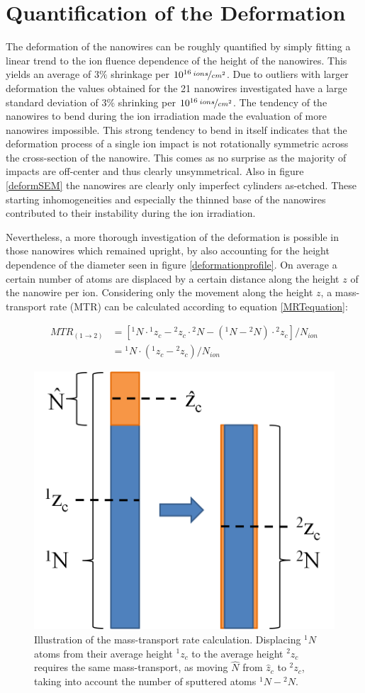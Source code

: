 \section{Quantification of the Deformation}
\label{sec:quantifydeformation}

The deformation of the nanowires can be roughly quantified by simply fitting a linear trend to the ion fluence dependence of the height of the nanowires. This yields an average of $3\%$ shrinkage per $10^{16}\,\nicefrac{ions}{cm^2}$. Due to outliers with larger deformation the values obtained for the 21 nanowires investigated have a large standard deviation of $3\%$ shrinking per $10^{16}\,\nicefrac{ions}{cm^2}$. The tendency of the nanowires to bend during the ion irradiation made the evaluation of more nanowires impossible. This strong tendency to bend in itself indicates that the deformation process of a single ion impact is not rotationally symmetric across the cross-section of the nanowire. This comes as no surprise as the majority of impacts are off-center and thus clearly unsymmetrical. Also in figure \ref{deformSEM} the nanowires are clearly only imperfect cylinders as-etched. These starting inhomogeneities and especially the thinned base of the nanowires contributed to their instability during the ion irradiation.

Nevertheless, a more thorough investigation of the deformation is possible in those nanowires which remained upright, by also accounting for the height dependence of the diameter seen in figure \ref{deformationprofile}. On average a certain number of atoms are displaced by a certain distance along the height $z$ of the nanowire per ion. Considering only the movement along the height $z$, a mass-transport rate (MTR) can be calculated according to equation \ref{MRTequation}:

\begin{equation}  
\begin{split}
    MTR_{(1 \rightarrow 2)} & = [ {}^{1}N\cdot {}^{1}z_{c} -{}^{2}z_{c} \cdot {}^{2}N - ({}^{1}N - {}^{2}N) \cdot {}^{2}z_{c}]/N_{ion} \\
		& = {}^{1}N \cdot ({}^{1}z_{c} - {}^{2}z_{c})/N_{ion} 
	\label{MRTequation}
	\end{split}
\end{equation}

\begin{figure}
	\centering
		\includegraphics[width=.3\textwidth]{images/MTRillustration.png}
	\caption{Illustration of the mass-transport rate calculation. Displacing ${}^{1}N$ atoms from their average height ${}^{1}z_{c}$ to the average height ${}^{2}z_{c}$ requires the same mass-transport, as moving $\hat{N}$ from $\hat{z}_c$ to ${}^{2}z_{c}$, taking into account the number of sputtered atoms ${}^{1}N-{}^{2}N$.}
	\label{MTRillustration}
\end{figure}

